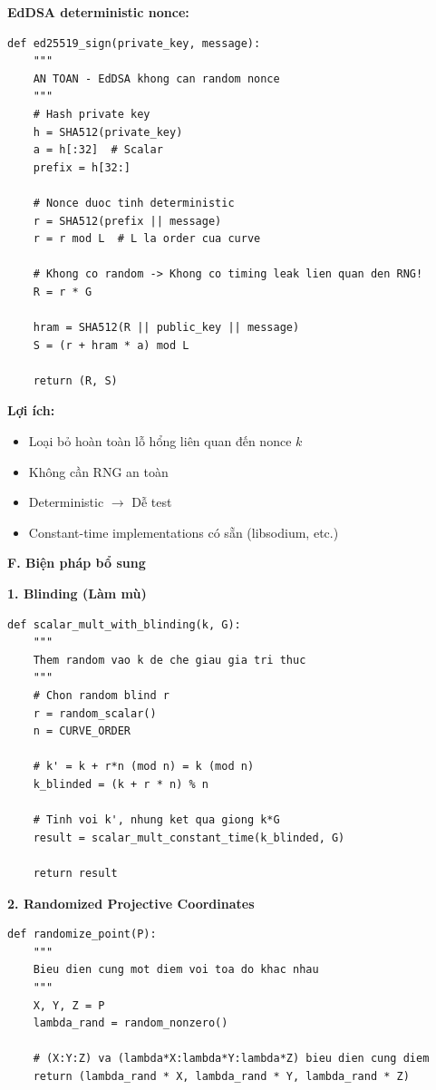 \textbf{EdDSA deterministic nonce:}

\begin{verbatim}
def ed25519_sign(private_key, message):
    """
    AN TOAN - EdDSA khong can random nonce
    """
    # Hash private key
    h = SHA512(private_key)
    a = h[:32]  # Scalar
    prefix = h[32:]
    
    # Nonce duoc tinh deterministic
    r = SHA512(prefix || message)
    r = r mod L  # L la order cua curve
    
    # Khong co random -> Khong co timing leak lien quan den RNG!
    R = r * G
    
    hram = SHA512(R || public_key || message)
    S = (r + hram * a) mod L
    
    return (R, S)
\end{verbatim}

\textbf{Lợi ích:}
\begin{itemize}
    \item Loại bỏ hoàn toàn lỗ hổng liên quan đến nonce $k$
    \item Không cần RNG an toàn
    \item Deterministic $\rightarrow$ Dễ test
    \item Constant-time implementations có sẵn (libsodium, etc.)
\end{itemize}

\textbf{F. Biện pháp bổ sung}

\textbf{1. Blinding (Làm mù)}

\begin{verbatim}
def scalar_mult_with_blinding(k, G):
    """
    Them random vao k de che giau gia tri thuc
    """
    # Chon random blind r
    r = random_scalar()
    n = CURVE_ORDER
    
    # k' = k + r*n (mod n) = k (mod n)
    k_blinded = (k + r * n) % n
    
    # Tinh voi k', nhung ket qua giong k*G
    result = scalar_mult_constant_time(k_blinded, G)
    
    return result
\end{verbatim}

\textbf{2. Randomized Projective Coordinates}

\begin{verbatim}
def randomize_point(P):
    """
    Bieu dien cung mot diem voi toa do khac nhau
    """
    X, Y, Z = P
    lambda_rand = random_nonzero()
    
    # (X:Y:Z) va (lambda*X:lambda*Y:lambda*Z) bieu dien cung diem
    return (lambda_rand * X, lambda_rand * Y, lambda_rand * Z)
\end{verbatim}

